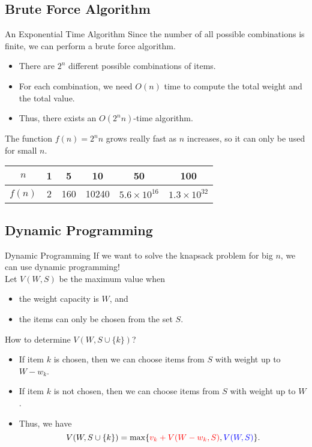 \documentclass{beamer}
\begin{document}
\subsection{Brute Force Algorithm}
\begin{frame}{An Exponential Time Algorithm}
  Since the number of all possible combinations is finite, we can perform a
  brute force algorithm. \pause
  \begin{itemize}
    \item There are $2^n$ different possible combinations of items. \pause
    \item For each combination, we need $O(n)$ time to compute the total weight
    and the total value. \pause
    \item Thus, there exists an $O(2^nn)$-time algorithm. \pause
  \end{itemize}
  \vspace{1em}
  The function $f(n) = 2^nn$ grows really fast as $n$ increases, so it can only
  be used for small $n$.
  \begin{center}
    \def\arraystretch{1.25}
    \begin{tabular}{|c|ccccc|}
      \hline
      $n$ & 1 & 5 & 10 & 50 & 100 \\
      \hline
      $f(n)$ & 2 & 160 & 10240 & $5.6 \times 10^{16}$ & $1.3 \times 10^{32}$ \\
      \hline
    \end{tabular}
  \end{center}
\end{frame}

\subsection{Dynamic Programming}
\begin{frame}{Dynamic Programming}
  If we want to solve the knapsack problem for big $n$, we can use dynamic
  programming! \pause \\[.5em]
  Let $V(W, S)$ be the maximum value when
  \begin{itemize}
    \item the weight capacity is $W$, and
    \item the items can only be chosen from the set $S$. \pause
  \end{itemize}
  \vspace{.5em}
  How to determine $V(W, S \cup \{k\})$? \pause
  \begin{itemize}
    \item If item $k$ is {\color{red}chosen}, then we can choose items from $S$
    with weight up to $W - w_k$. \pause
    \item If item $k$ is {\color{blue}not chosen}, then we can choose items
    from $S$ with weight up to $W$. \pause
    \item Thus, we have
    \begin{equation*}
      V(W, S \cup \{k\}) = \max\{
        {\color{red}v_k + V(W - w_k, S)},
        {\color{blue}V(W, S)}\}.
    \end{equation*}
  \end{itemize}
\end{frame}
\end{document}
